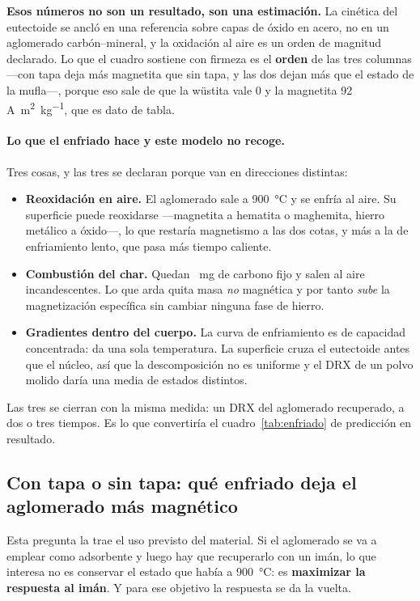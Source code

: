 \documentclass[11pt,a4paper]{article}
\newcommand{\ojo}[1]{\textcolor{aviso}{\textbf{#1}}}
\begin{document}
\ojo{Esos números no son un resultado, son una estimación.} La cinética del
eutectoide se ancló en una referencia sobre capas de óxido en acero, no en un
aglomerado carbón--mineral, y la oxidación al aire es un orden de magnitud
declarado. Lo que el cuadro sostiene con firmeza es el \textbf{orden} de las
tres columnas ---con tapa deja más magnetita que sin tapa, y las dos dejan más
que el estado de la mufla---, porque eso sale de que la wüstita vale 0 y la
magnetita 92 \si{\ampere\meter\squared\per\kilo\gram}, que es dato de tabla.

\paragraph{Lo que el enfriado hace y este modelo no recoge.} Tres cosas, y las
tres se declaran porque van en direcciones distintas:

\begin{itemize}[leftmargin=*,itemsep=2pt]
\item \textbf{Reoxidación en aire.} El aglomerado sale a \SI{900}{\celsius} y se
enfría al aire. Su superficie puede reoxidarse ---magnetita a hematita o
maghemita, hierro metálico a óxido---, lo que restaría magnetismo a las dos
cotas, y más a la de enfriamiento lento, que pasa más tiempo caliente.
\item \textbf{Combustión del char.} Quedan \datCarbono\ \si{\milli\gram} de
carbono fijo y salen al aire incandescentes. Lo que arda quita masa \emph{no}
magnética y por tanto \emph{sube} la magnetización específica sin cambiar
ninguna fase de hierro.
\item \textbf{Gradientes dentro del cuerpo.} La curva de enfriamiento es de
capacidad concentrada: da una sola temperatura. La superficie cruza el
eutectoide antes que el núcleo, así que la descomposición no es uniforme y el
DRX de un polvo molido daría una media de estados distintos.
\end{itemize}

\noindent
Las tres se cierran con la misma medida: un DRX del aglomerado recuperado, a dos
o tres tiempos. Es lo que convertiría el cuadro~\ref{tab:enfriado} de predicción
en resultado.

\subsection{Con tapa o sin tapa: qué enfriado deja el aglomerado más magnético}
\label{sec:rutas}

Esta pregunta la trae el uso previsto del material. Si el aglomerado se va a
emplear como adsorbente y luego hay que recuperarlo con un imán, lo que interesa
no es conservar el estado que había a \SI{900}{\celsius}: es \textbf{maximizar la
respuesta al imán}. Y para ese objetivo la respuesta se da la vuelta.
\end{document}
